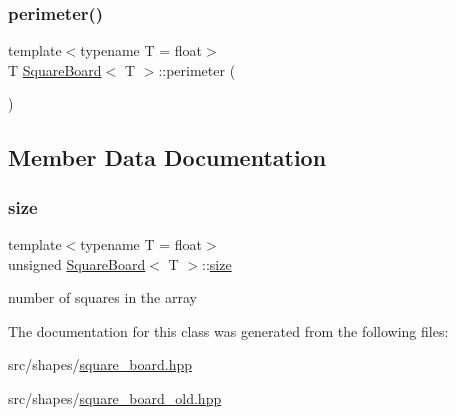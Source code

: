 \mbox{\label{classSquareBoard_a8b2ae6ea7295b2bff171b3d6311a456c}} 
\subsubsection{\texorpdfstring{perimeter()}{perimeter()}\hspace{0.1cm}{\footnotesize\ttfamily [2/2]}}
{\footnotesize\ttfamily template$<$typename T  = float$>$ \\
T \mbox{\hyperlink{classSquareBoard}{Square\+Board}}$<$ T $>$\+::perimeter (\begin{DoxyParamCaption}{ }\end{DoxyParamCaption})}



\subsection{Member Data Documentation}
\mbox{\label{classSquareBoard_a92007159761cd4dfe85aaaa11103ea84}} 
\subsubsection{\texorpdfstring{size}{size}}
{\footnotesize\ttfamily template$<$typename T  = float$>$ \\
unsigned \mbox{\hyperlink{classSquareBoard}{Square\+Board}}$<$ T $>$\+::\mbox{\hyperlink{glad_8h_adead0e00f1033fff2918e18853add2b1}{size}}\hspace{0.3cm}{\ttfamily [private]}}

number of squares in the array 

The documentation for this class was generated from the following files\+:\begin{DoxyCompactItemize}
\item 
src/shapes/\mbox{\hyperlink{square__board_8hpp}{square\+\_\+board.\+hpp}}\item 
src/shapes/\mbox{\hyperlink{square__board__old_8hpp}{square\+\_\+board\+\_\+old.\+hpp}}\end{DoxyCompactItemize}
